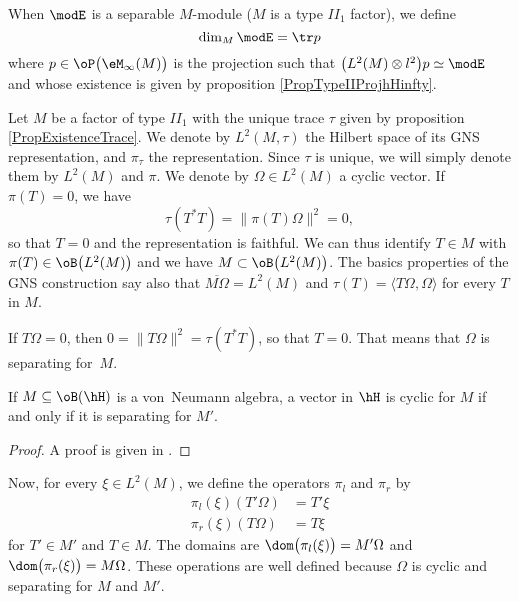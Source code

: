 When $\modE$ is a separable $M$-module ($M$ is a type $II_1$ factor), we define
\begin{equation}
	\dim_M\modE=\tr p
\end{equation}
where $p\in\oP\big( \eM_{\infty}(M) \big)$ is the projection such that $\big( L^2(M)\otimes l^2 \big)p\simeq \modE$ and whose existence is given by proposition \ref{PropTypeIIProjhHinfty}.

Let $M$ be a factor of type $II_1$ with the unique trace $\tau$ given by proposition \ref{PropExistenceTrace}. We denote by $L^2(M,\tau)$ the Hilbert space of its GNS representation, and $\pi_{\tau}$ the representation. Since $\tau$ is unique, we will simply denote them by $L^2(M)$ and $\pi$. We denote by $\Omega\in L^2(M)$ a cyclic vector. If $\pi(T)=0$, we have
\[ 
	\tau(T^*T)=\| \pi(T)\Omega \|^2=0,
\]
so that $T=0$ and the representation is faithful. We can thus identify $T\in M$ with $\pi(T)\in \oB\big( L^2(M) \big)$ and we have $M\subset\oB\big( L^2(M) \big)$. The basics properties of the GNS construction say also that $\overline{ M\Omega }=L^2(M)$ and $\tau(T)=\langle T\Omega, \Omega\rangle $ for every $T$ in $M$. 

If $T\Omega=0$, then $0=\| T\Omega \|^2=\tau(T^*T)$, so that $T=0$. That means that $\Omega$ is separating for~$M$.

\begin{lemma}
If $M\subseteq\oB(\hH)$ is a von~Neumann algebra, a vector in $\hH$ is cyclic for $M$ if and only if it is separating for $M'$.
\end{lemma}
\begin{proof}
A proof is given in \cite{JonesSunder}.
\end{proof}

Now, for every $\xi\in L^2(M)$, we define the operators $\pi_l$ and $\pi_r$ by
\begin{subequations}
\begin{align}
	\pi_l(\xi)(T'\Omega)&= T'\xi\\
	\pi_r(\xi)(T\Omega) &= T\xi
\end{align}
\end{subequations}
for $T'\in M'$ and $T\in M$. The domains are $\dom\big( \pi_l(\xi) \big)=M'\Omega$ and $\dom\big( \pi_r(\xi) \big)=M\Omega$. These operations are well defined because $\Omega$ is cyclic and separating for $M$ and $M'$.

